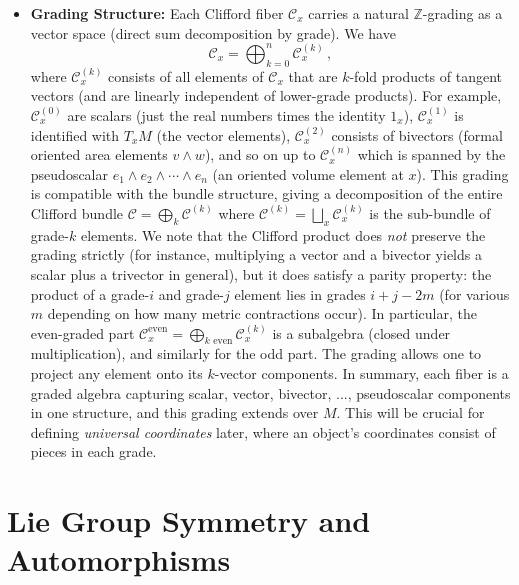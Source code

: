 \documentclass[12pt]{article}
\begin{document}
\begin{itemize}
    \item \textbf{Grading Structure:} Each Clifford fiber $\mathcal{C}_x$ carries a natural $\mathbb{Z}$-grading as a vector space (direct sum decomposition by grade). We have 
    \[
       \mathcal{C}_x = \bigoplus_{k=0}^{n} \mathcal{C}_x^{(k)}\,,
    \] 
    where $\mathcal{C}_x^{(k)}$ consists of all elements of $\mathcal{C}_x$ that are $k$-fold products of tangent vectors (and are linearly independent of lower-grade products). For example, $\mathcal{C}_x^{(0)}$ are scalars (just the real numbers times the identity $1_x$), $\mathcal{C}_x^{(1)}$ is identified with $T_x M$ (the vector elements), $\mathcal{C}_x^{(2)}$ consists of bivectors (formal oriented area elements $v\wedge w$), and so on up to $\mathcal{C}_x^{(n)}$ which is spanned by the pseudoscalar $e_1\wedge e_2\wedge \cdots \wedge e_n$ (an oriented volume element at $x$). This grading is compatible with the bundle structure, giving a decomposition of the entire Clifford bundle $\mathcal{C} = \bigoplus_{k} \mathcal{C}^{(k)}$ where $\mathcal{C}^{(k)} = \bigsqcup_{x} \mathcal{C}_x^{(k)}$ is the sub-bundle of grade-$k$ elements. We note that the Clifford product does \emph{not} preserve the grading strictly (for instance, multiplying a vector and a bivector yields a scalar plus a trivector in general), but it does satisfy a parity property: the product of a grade-$i$ and grade-$j$ element lies in grades $i+j-2m$ (for various $m$ depending on how many metric contractions occur). In particular, the even-graded part $\mathcal{C}_x^{\text{even}} = \bigoplus_{k \text{ even}} \mathcal{C}_x^{(k)}$ is a subalgebra (closed under multiplication), and similarly for the odd part. The grading allows one to project any element onto its $k$-vector components. In summary, each fiber is a graded algebra capturing scalar, vector, bivector, ..., pseudoscalar components in one structure, and this grading extends over $M$. This will be crucial for defining \emph{universal coordinates} later, where an object’s coordinates consist of pieces in each grade.
\end{itemize}

\section{Lie Group Symmetry and Automorphisms}
\end{document}
